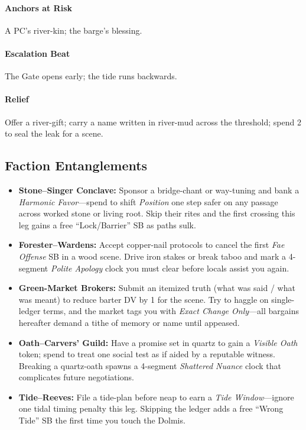 \paragraph{Anchors at Risk} A PC’s river-kin; the barge’s blessing.
\paragraph{Escalation Beat} The Gate opens early; the tide runs backwards.
\paragraph{Relief} Offer a river-gift; carry a name written in river-mud across the threshold; spend 2 \Boons{} to seal the leak for a scene.


\subsection*{Faction Entanglements}
\begin{itemize}
  \item \textbf{Stone–Singer Conclave:} Sponsor a bridge-chant or way-tuning and bank a \emph{Harmonic Favor}—spend to shift \emph{Position} one step safer on any passage across worked stone or living root. Skip their rites and the first crossing this leg gains a free “Lock/Barrier” SB as paths sulk.
  \item \textbf{Forester–Wardens:} Accept copper-nail protocols to cancel the first \emph{Fae Offense} SB in a wood scene. Drive iron stakes or break taboo and mark a 4-segment \emph{Polite Apology} clock you must clear before locals assist you again.
  \item \textbf{Green-Market Brokers:} Submit an itemized truth (what was said / what was meant) to reduce barter DV by 1 for the scene. Try to haggle on single-ledger terms, and the market tags you with \emph{Exact Change Only}—all bargains hereafter demand a tithe of memory or name until appeased.
  \item \textbf{Oath–Carvers’ Guild:} Have a promise set in quartz to gain a \emph{Visible Oath} token; spend to treat one social test as if aided by a reputable witness. Breaking a quartz-oath spawns a 4-segment \emph{Shattered Nuance} clock that complicates future negotiations.
  \item \textbf{Tide–Reeves:} File a tide-plan before neap to earn a \emph{Tide Window}—ignore one tidal timing penalty this leg. Skipping the ledger adds a free “Wrong Tide” SB the first time you touch the Dolmis.
\end{itemize}

